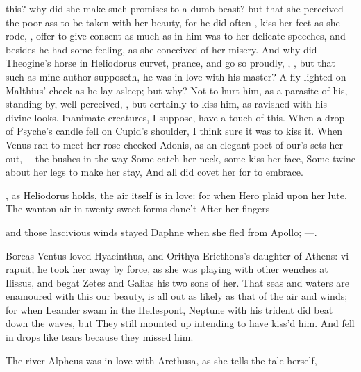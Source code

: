 {this? why did she make such promises to a dumb beast? but that she
perceived the poor ass to be taken with her beauty, for he did often
, kiss her feet as she rode,
, offer to give consent as
much as in him was to her delicate speeches, and besides he had some
feeling, as she conceived of her misery. And why did Theogine's horse
in Heliodorus curvet, prance, and go so proudly, , \etc{}, but that such as mine author supposeth,
he was in love with his master?  A fly lighted on  Malthius'
cheek as he lay asleep; but why? Not to hurt him, as a parasite of his,
standing by, well perceived, , but
certainly to kiss him, as ravished with his divine looks. Inanimate
creatures, I suppose, have a touch of this. When a drop of
Psyche's candle fell on Cupid's shoulder, I think sure it was to
kiss it. When Venus ran to meet her rose-cheeked Adonis, as an elegant
poet of our's sets her out,
---the bushes in the way
Some catch her neck, some kiss her face,
Some twine about her legs to make her stay,
And all did covet her for to embrace.

, as Heliodorus holds, the air itself is in
love: for when Hero plaid upon her lute,
The wanton air in twenty sweet forms danc't
After her fingers---

and those lascivious winds stayed Daphne when she fled from Apollo;
---.

Boreas Ventus loved Hyacinthus, and Orithya Ericthons's daughter of
Athens: vi rapuit, \etc{} he took her away by force, as she was playing
with other wenches at Ilissus, and begat Zetes and Galias his two sons
of her. That seas and waters are enamoured with this our beauty, is all
out as likely as that of the air and winds; for when Leander swam in
the Hellespont, Neptune with his trident did beat down the waves, but
They still mounted up intending to have kiss'd him.
And fell in drops like tears because they missed him.

The river Alpheus was in love with Arethusa, as she tells the
tale herself,

}
